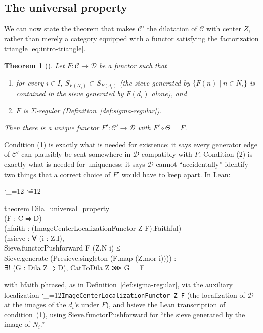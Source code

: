 \documentclass[11pt]{amsart}
\newcommand{\lc}[1]{\url{#1}}
\newcommand{\lcode}{\begingroup\catcode`\_=12\relax\lcodeInner}
\newcommand{\lcodeInner}[1]{\texttt{#1}\endgroup}
\newenvironment{leancode}{%
  \begingroup
  \catcode`\_=12\relax
  \catcode`\^=12\relax
  \small\ttfamily\raggedright\baselineskip=1.15\baselineskip
  \par\smallskip\noindent
}{%
  \par\smallskip
  \endgroup
}
\theoremstyle{plain}
\newtheorem{theorem}{Theorem}[section]
\theoremstyle{definition}
\theoremstyle{remark}
\newcommand{\calC}{\mathcal C}
\newcommand{\calD}{\mathcal D}
\begin{document}
\subsection{The universal property}
\label{sec:universal-property-statement}

We can now state the theorem that makes $\calC'$ the dilatation of $\calC$ with center $Z$,
rather than merely a category equipped with a functor satisfying the factorization
triangle \eqref{eq:intro-triangle}.

\begin{theorem}[{\citep[Theorem~3.10]{Mayeux}}]
\label{thm:universal-property}
Let $F : \calC \to \calD$ be a functor such that
\begin{enumerate}
\item[(1)] for every $i \in I$, $S_{F(N_i)} \subset S_{F(d_i)}$ (the sieve generated by
  $\{F(n) \mid n\in N_i\}$ is contained in the sieve generated by $F(d_i)$ alone), and
\item[(2)] $F$ is $\Sigma$-regular (Definition~\ref{def:sigma-regular}).
\end{enumerate}
Then there is a unique functor $F' : \calC' \to \calD$ with $F' \circ \Theta = F$.
\end{theorem}

Condition (1) is exactly what is needed for existence: it says every generator edge of
$\calC'$ can plausibly be sent somewhere in $\calD$ compatibly with $F$. Condition (2) is
exactly what is needed for uniqueness: it says $\calD$ cannot ``accidentally'' identify
two things that a correct choice of $F'$ would have to keep apart. In Lean:

\begin{leancode}
theorem Dila_universal_property \\
    (F : C ⥤ D) \\
    (hfaith : (ImageCenterLocalizationFunctor Z F).Faithful) \\
    (hsieve : ∀ (i : Z.I), \\
      Sieve.functorPushforward F (Z.N i) ≤ \\
        Sieve.generate (Presieve.singleton (F.map (Z.mor i)))) : \\
    ∃! (G : Dila Z ⥤ D), CatToDila Z ⋙ G = F \\
\end{leancode}
with \lc{hfaith} phrased, as in Definition~\ref{def:sigma-regular}, via the auxiliary
localization \lcode{ImageCenterLocalizationFunctor Z F} (the localization of $\calD$ at the
images of the $d_i$'s under $F$), and \lc{hsieve} the Lean transcription of condition~(1),
using \lc{Sieve.functorPushforward} for ``the sieve generated by the image of $N_i$.''
\end{document}

